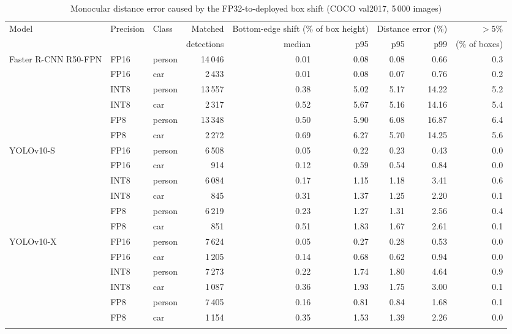 \documentclass[pdflatex,sn-mathphys-num]{sn-jnl}%
\theoremstyle{thmstyleone}%
\theoremstyle{thmstyletwo}%
\theoremstyle{thmstylethree}%
\begin{document}
\begin{appendices}
\begin{table}
\footnotesize\setlength{\tabcolsep}{4pt}
\caption{Monocular distance error caused by the FP32-to-deployed box shift (COCO val2017, 5\,000 images)}\label{tab:localization}
\begin{tabular}{@{}lllrrrrrr@{}}
\toprule
Model & Precision & Class & Matched & \multicolumn{2}{c}{Bottom-edge shift (\% of box height)} & \multicolumn{2}{c}{Distance error (\%)} & $>5$\% \\
\cmidrule{5-6}\cmidrule{7-8}
 & & & detections & median & p95 & p95 & p99 & (\% of boxes) \\
\midrule
Faster R-CNN R50-FPN & FP16 & person & 14\,046 & 0.01 & 0.08 & 0.08 & 0.66 & 0.3 \\
 & FP16 & car & 2\,433 & 0.01 & 0.08 & 0.07 & 0.76 & 0.2 \\
 & INT8 & person & 13\,557 & 0.38 & 5.02 & 5.17 & 14.22 & 5.2 \\
 & INT8 & car & 2\,317 & 0.52 & 5.67 & 5.16 & 14.16 & 5.4 \\
 & FP8 & person & 13\,348 & 0.50 & 5.90 & 6.08 & 16.87 & 6.4 \\
 & FP8 & car & 2\,272 & 0.69 & 6.27 & 5.70 & 14.25 & 5.6 \\
\midrule
YOLOv10-S & FP16 & person & 6\,508 & 0.05 & 0.22 & 0.23 & 0.43 & 0.0 \\
 & FP16 & car & 914 & 0.12 & 0.59 & 0.54 & 0.84 & 0.0 \\
 & INT8 & person & 6\,084 & 0.17 & 1.15 & 1.18 & 3.41 & 0.6 \\
 & INT8 & car & 845 & 0.31 & 1.37 & 1.25 & 2.20 & 0.1 \\
 & FP8 & person & 6\,219 & 0.23 & 1.27 & 1.31 & 2.56 & 0.4 \\
 & FP8 & car & 851 & 0.51 & 1.83 & 1.67 & 2.61 & 0.1 \\
\midrule
YOLOv10-X & FP16 & person & 7\,624 & 0.05 & 0.27 & 0.28 & 0.53 & 0.0 \\
 & FP16 & car & 1\,205 & 0.14 & 0.68 & 0.62 & 0.94 & 0.0 \\
 & INT8 & person & 7\,273 & 0.22 & 1.74 & 1.80 & 4.64 & 0.9 \\
 & INT8 & car & 1\,087 & 0.36 & 1.93 & 1.75 & 3.00 & 0.1 \\
 & FP8 & person & 7\,405 & 0.16 & 0.81 & 0.84 & 1.68 & 0.1 \\
 & FP8 & car & 1\,154 & 0.35 & 1.53 & 1.39 & 2.26 & 0.0 \\
\botrule
\end{tabular}
\end{table}


\end{appendices}
\end{document}

